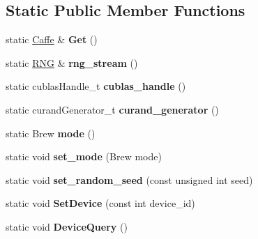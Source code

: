 \subsection*{Static Public Member Functions}
\begin{DoxyCompactItemize}
\item 
\mbox{\label{classcaffe_1_1_caffe_a169632a1735728f6bdaacbbe77b81804}} 
static \mbox{\hyperlink{classcaffe_1_1_caffe}{Caffe}} \& {\bfseries Get} ()
\item 
\mbox{\label{classcaffe_1_1_caffe_aff31f4285d99f4254e2af4e40678bf5e}} 
static \mbox{\hyperlink{classcaffe_1_1_caffe_1_1_r_n_g}{R\+NG}} \& {\bfseries rng\+\_\+stream} ()
\item 
\mbox{\label{classcaffe_1_1_caffe_afbba8bb2af70b628eca89269b81c915f}} 
static cublas\+Handle\+\_\+t {\bfseries cublas\+\_\+handle} ()
\item 
\mbox{\label{classcaffe_1_1_caffe_a659f92f48f20d95c46c6629574a26c0f}} 
static curand\+Generator\+\_\+t {\bfseries curand\+\_\+generator} ()
\item 
\mbox{\label{classcaffe_1_1_caffe_aa45214769b727ecd971e0d5ed8ffe96a}} 
static Brew {\bfseries mode} ()
\item 
\mbox{\label{classcaffe_1_1_caffe_a025008ff5854ba15e62138c81b7a140d}} 
static void {\bfseries set\+\_\+mode} (Brew mode)
\item 
\mbox{\label{classcaffe_1_1_caffe_a1f6f560b0f9f73a596284908ee44ecc7}} 
static void {\bfseries set\+\_\+random\+\_\+seed} (const unsigned int seed)
\item 
\mbox{\label{classcaffe_1_1_caffe_ac95c04832bf528acb3ae8f1ffa5b6c11}} 
static void {\bfseries Set\+Device} (const int device\+\_\+id)
\item 
\mbox{\label{classcaffe_1_1_caffe_a4af30f25dc929f2b9c1f195e1683a411}} 
static void {\bfseries Device\+Query} ()
\item 
\mbox{\label{classcaffe_1_1_caffe_ae910c49602d48889673dd614d2aea014}} 

\end{DoxyCompactItemize}
